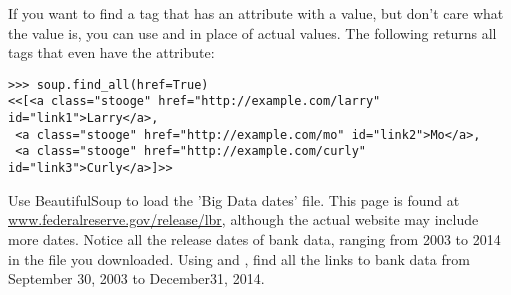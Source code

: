 If you want to find a tag that has an attribute with a value, but don't care what the value is, you can use  and  in place of actual values.
The following returns all tags that even have the  attribute:
\begin{lstlisting}
>>> soup.find_all(href=True)
<<[<a class="stooge" href="http://example.com/larry" id="link1">Larry</a>,
 <a class="stooge" href="http://example.com/mo" id="link2">Mo</a>,
 <a class="stooge" href="http://example.com/curly" id="link3">Curly</a>]>>
\end{lstlisting}

\begin{problem}

Use BeautifulSoup to load the 'Big Data dates' file.
This page is found at \url{www.federalreserve.gov/release/lbr}, although the actual website may include more dates.
Notice all the release dates of bank data, ranging from 2003 to 2014 in the file you downloaded.
Using  and , find all the links to bank data from September 30, 2003 to December31, 2014.

\end{problem}
